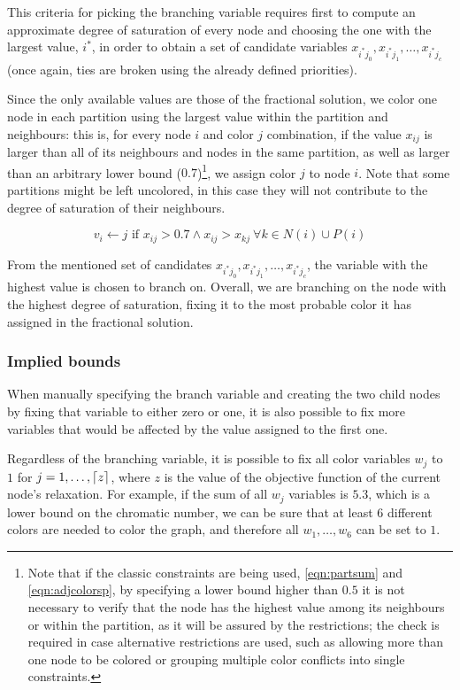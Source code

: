 This criteria for picking the branching variable requires first to compute an approximate degree of saturation of every node and choosing the one with the largest value, $i^*$, in order to obtain a set of candidate variables $x_{i^*j_0}, x_{i^*j_1}, \ldots, x_{i^*j_c}$ (once again, ties are broken using the already defined priorities).

Since the only available values are those of the fractional solution, we color one node in each partition using the largest value within the partition and neighbours: this is, for every node $i$ and color $j$ combination, if the value $x_{ij}$ is larger than all of its neighbours and nodes in the same partition, as well as larger than an arbitrary lower bound ($0.7$)\footnote{Note that if the classic constraints are being used, \ref{eqn:partsum} and \ref{eqn:adjcolorsp}, by specifying a lower bound higher than $0.5$ it is not necessary to verify that the node has the highest value among its neighbours or within the partition, as it will be assured by the restrictions; the check is required in case alternative restrictions are used, such as allowing more than one node to be colored or grouping multiple color conflicts into single constraints.}, we assign color $j$ to node $i$. Note that some partitions might be left uncolored, in this case they will not contribute to the degree of saturation of their neighbours.

\begin{equation}
\label{eqn:fixcriteria}
v_i \leftarrow j \text{ if } x_{ij} > 0.7 \wedge x_{ij} > x_{kj}\ \forall k \in N(i) \cup P(i)
\end{equation}

From the mentioned set of candidates $x_{i^*j_0}, x_{i^*j_1}, \ldots, x_{i^*j_c}$, the variable with the highest value is chosen to branch on. Overall, we are branching on the node with the highest degree of saturation, fixing it to the most probable color it has assigned in the fractional solution.

\subsubsection*{Implied bounds}

When manually specifying the branch variable and creating the two child nodes by fixing that variable to either zero or one, it is also possible to fix more variables that would be affected by the value assigned to the first one.

Regardless of the branching variable, it is possible to fix all color variables $w_j$ to $1$ for $j = 1,\ldots,\left\lceil z \right\rceil$, where $z$ is the value of the objective function of the current node's relaxation. For example, if the sum of all $w_j$ variables is $5.3$, which is a lower bound on the chromatic number, we can be sure that at least $6$ different colors are needed to color the graph, and therefore all $w_1,\ldots,w_6$ can be set to $1$.

